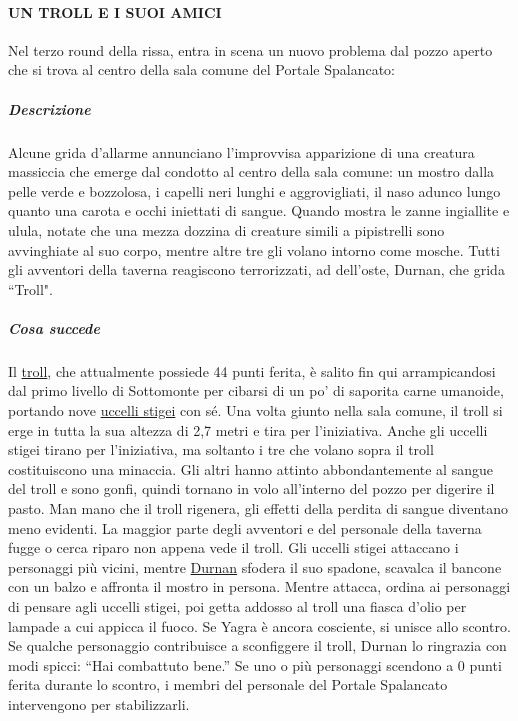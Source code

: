 \documentclass{article}
\begin{document}
\paragraph{UN TROLL E I SUOI AMICI}
Nel terzo round della rissa, entra in scena un nuovo
problema dal pozzo aperto che si trova al centro della sala
comune del Portale Spalancato:

\subparagraph{Descrizione}Alcune grida d'allarme annunciano l'improvvisa
apparizione di una creatura massiccia che emerge
dal condotto al centro della sala comune: un mostro
dalla pelle verde e bozzolosa, i capelli neri lunghi e
aggrovigliati, il naso adunco lungo quanto una carota
e occhi iniettati di sangue. Quando mostra le zanne
ingiallite e ulula, notate che una mezza dozzina di
creature simili a pipistrelli sono avvinghiate al suo corpo,
mentre altre tre gli volano intorno come mosche. Tutti
gli avventori della taverna reagiscono terrorizzati, ad dell'oste, Durnan, che grida “Troll".

\subparagraph{Cosa succede}
Il \hyperlink{troll}{ troll}, che attualmente possiede 44 punti ferita, è salito
fin qui arrampicandosi dal primo livello di Sottomonte per
cibarsi di un po' di saporita carne umanoide, portando nove
\hyperlink{uccelli}{uccelli stigei} con sé. Una volta giunto nella sala comune,
il troll si erge in tutta la sua altezza di 2,7 metri e tira per
l'iniziativa. Anche gli uccelli stigei tirano per l'iniziativa,
ma soltanto i tre che volano sopra il troll costituiscono una
minaccia. Gli altri hanno attinto abbondantemente al sangue
del troll e sono gonfi, quindi tornano in volo all’interno del
pozzo per digerire il pasto. Man mano che il troll rigenera,
gli effetti della perdita di sangue diventano meno evidenti.
La maggior parte degli avventori e del personale della
taverna fugge o cerca riparo non appena vede il troll. Gli
uccelli stigei attaccano i personaggi più vicini, mentre
\hyperlink{Duran}{Durnan} sfodera il suo spadone,
scavalca il bancone con un balzo e affronta il mostro in
persona. Mentre attacca, ordina ai personaggi di pensare
agli uccelli stigei, poi getta addosso al troll una fiasca d'olio
per lampade a cui appicca il fuoco. Se Yagra è ancora
cosciente, si unisce allo scontro. Se qualche personaggio
contribuisce a sconfiggere il troll, Durnan lo ringrazia con
modi spicci: “Hai combattuto bene.”
Se uno o più personaggi scendono a 0 punti ferita
durante lo scontro, i membri del personale del Portale
Spalancato intervengono per stabilizzarli.
\end{document}
